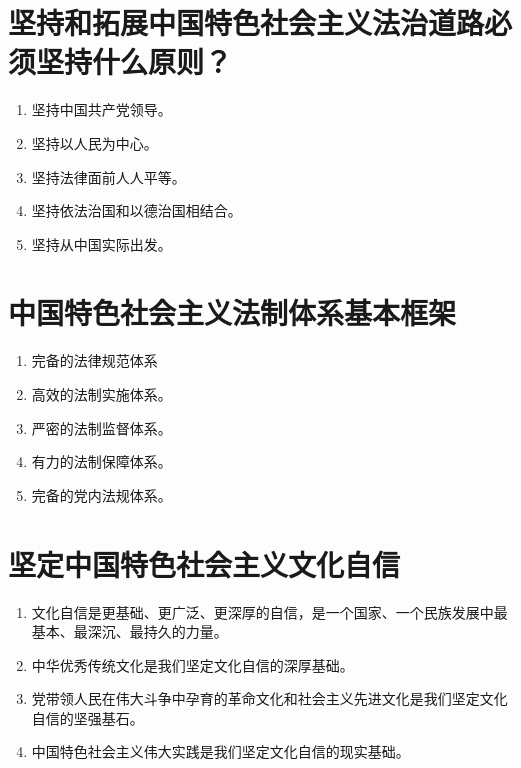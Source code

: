\documentclass[12pt, a4paper, oneside]{ctexbook}
\begin{document}
\section{坚持和拓展中国特色社会主义法治道路必须坚持什么原则？}

\begin{enumerate}
\item 坚持中国共产党领导。

\item 坚持以人民为中心。

\item 坚持法律面前人人平等。

\item 坚持依法治国和以德治国相结合。

\item 坚持从中国实际出发。
\end{enumerate}

\section{中国特色社会主义法制体系基本框架}
\begin{enumerate}
\item 完备的法律规范体系

\item 高效的法制实施体系。

\item 严密的法制监督体系。

\item 有力的法制保障体系。

\item 完备的党内法规体系。
\end{enumerate}

\section{坚定中国特色社会主义文化自信}

\begin{enumerate}
\item 文化自信是更基础、更广泛、更深厚的自信，是一个国家、一个民族发展中最基本、最深沉、最持久的力量。

\item 中华优秀传统文化是我们坚定文化自信的深厚基础。

\item 党带领人民在伟大斗争中孕育的革命文化和社会主义先进文化是我们坚定文化自信的坚强基石。

\item 中国特色社会主义伟大实践是我们坚定文化自信的现实基础。
\end{enumerate}
\end{document}
